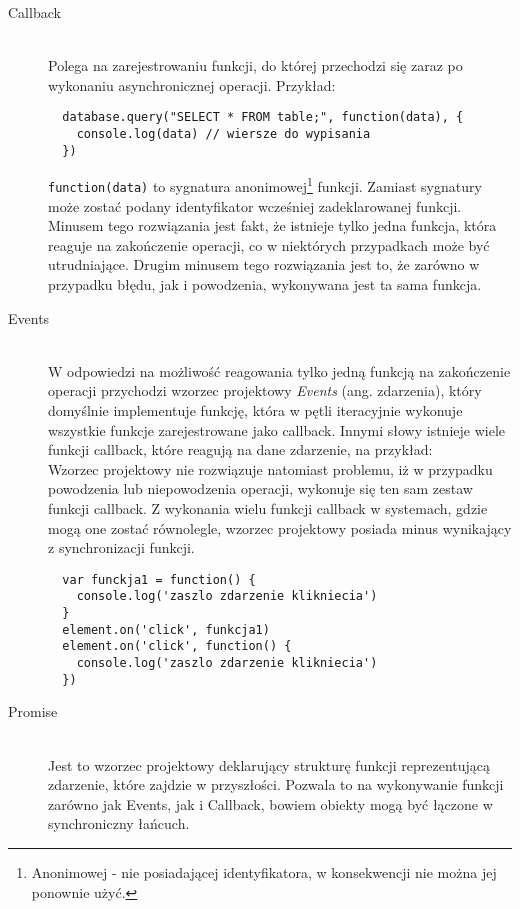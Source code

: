 \begin{description}
  \item[Callback] \hfill \\
  Polega na zarejestrowaniu funkcji, do której przechodzi się zaraz po wykonaniu asynchronicznej operacji. Przykład:
  \lstset{language=Octave}
  \begin{lstlisting}
  database.query("SELECT * FROM table;", function(data), {
  	console.log(data) // wiersze do wypisania
  })
  \end{lstlisting}
  \lstinline{function(data)} to sygnatura anonimowej\footnote{Anonimowej - nie posiadającej identyfikatora, w konsekwencji nie można jej ponownie użyć.} funkcji. Zamiast sygnatury może zostać podany identyfikator wcześniej zadeklarowanej funkcji. Minusem tego rozwiązania jest fakt, że istnieje tylko jedna funkcja, która reaguje na zakończenie operacji, co w niektórych przypadkach może być utrudniające. Drugim minusem tego rozwiązania jest to, że zarówno w przypadku błędu, jak i powodzenia, wykonywana jest ta sama funkcja.
  \item[Events] \hfill \\
  W odpowiedzi na możliwość reagowania tylko jedną funkcją na zakończenie operacji przychodzi wzorzec projektowy \emph{Events} (ang. zdarzenia), który domyślnie implementuje funkcję, która w pętli iteracyjnie wykonuje wszystkie funkcje zarejestrowane jako callback. Innymi słowy istnieje wiele funkcji callback, które reagują na dane zdarzenie, na przykład:\\
  Wzorzec projektowy nie rozwiązuje natomiast problemu, iż w przypadku powodzenia lub niepowodzenia operacji, wykonuje się ten sam zestaw funkcji callback. Z wykonania wielu funkcji callback w systemach, gdzie mogą one zostać równolegle, wzorzec projektowy posiada minus wynikający z synchronizacji funkcji.
  \lstset{language=Octave}
  \begin{lstlisting}
  var funckja1 = function() {
  	console.log('zaszlo zdarzenie klikniecia')
  }
  element.on('click', funkcja1)
  element.on('click', function() {
  	console.log('zaszlo zdarzenie klikniecia')
  })
  \end{lstlisting}
  \item[Promise] \hfill \\
  Jest to wzorzec projektowy deklarujący strukturę funkcji reprezentującą zdarzenie, które zajdzie w przyszłości. Pozwala to na wykonywanie funkcji zarówno jak Events, jak i Callback, bowiem obiekty mogą być łączone w synchroniczny łańcuch.
\end{description}

